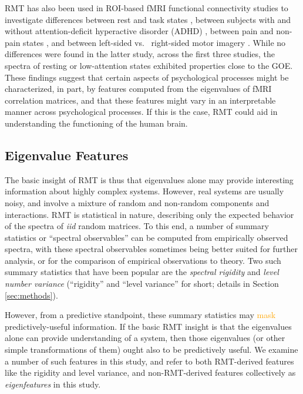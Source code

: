 \documentclass[12pt]{spieman}  %
\begin{document}
\begin{spacing}{2}
RMT has also been used in ROI-based fMRI functional connectivity studies to
investigate differences between rest and task states
\cite{wangSpectralPropertiesTemporal2015}, between subjects with and without
attention-deficit hyperactive disorder (ADHD)
\cite{wangRandomMatrixTheory2016}, between pain and non-pain states
\cite{matharooSpontaneousBackpainAlters2020}, and between left-sided vs. \
right-sided motor imagery \cite{guRandomMatrixTheory2020}. While no differences
were found in the latter study, across the first three studies, the spectra of
resting or low-attention states exhibited properties close to the GOE. These
findings suggest that certain aspects of psychological processes might be
characterized, in part, by features computed from the eigenvalues of fMRI
correlation matrices, and that these features might vary in an interpretable
manner across psychological processes. If this is the case, RMT could aid in
understanding the functioning of the human brain.


\subsection{Eigenvalue Features}

The basic insight of RMT is thus that eigenvalues alone may provide
interesting information about highly complex systems. However, real systems are
usually noisy, and involve a mixture of random and non-random components and
interactions. RMT is statistical in nature, describing only the expected
behavior of the spectra of \textit{iid} random matrices. To this end, a number
of summary statistics or ``spectral observables''
\cite{mehtaRandomMatrices2004, guhrRandommatrixTheoriesQuantum1998a} can be
computed from empirically observed spectra, with these spectral observables
sometimes being better suited for further analysis, or for the comparison of
empirical observations to theory. Two such summary statistics that have been
popular\cite{santhanamStatisticsAtmosphericCorrelations2001,
jalanUncoveringRandomnessSuccess2014, matharooSpontaneousBackpainAlters2020,
bandyopadhyayUniversalityComplexNetworks2007,
agrawalQuantifyingRandomnessProtein2014, raiRandomnessPreservedPatterns2015,
sebaRandomMatrixAnalysis2003,wangSpectralPropertiesTemporal2015,
wangRandomMatrixTheory2016} are the \textit{spectral rigidity} and
\textit{level number variance} (``rigidity'' and ``level variance'' for short;
details in Section \ref{sec:methods}).

However, from a predictive standpoint, these summary statistics may
\textcolor{orange}{mask} predictively-useful information. If the basic RMT
insight is that the eigenvalues alone can provide understanding of a system,
then those eigenvalues (or other simple transformations of them) ought also to
be predictively useful.
We examine a number of such features in this study, and refer to both
RMT-derived features like the rigidity and level variance, and non-RMT-derived
features collectively as \textit{eigenfeatures} in this study.


\end{spacing}
\end{document}
